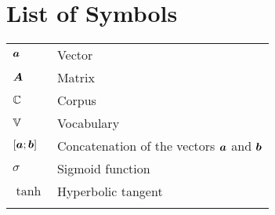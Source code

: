 \chapter{List of Symbols}
\begin{tabular}{ll}
\vspace{2mm}
$\bm{a}$    &Vector\\ \vspace{2mm}
$\bm{A}$    &Matrix\\ \vspace{2mm}
$\mathbb{C}$     &Corpus\\ \vspace{2mm}
$\mathbb{V}$      &Vocabulary \\ \vspace{2mm}
$[\bm{a}; \bm{b}]$ &Concatenation of the vectors $\bm{a}$ and $\bm{b}$ \\ \vspace{2mm}
$\sigma$ & Sigmoid function \\ \vspace{2mm}
$\tanh$ & Hyperbolic tangent \\ \vspace{2mm}
\end{tabular}
